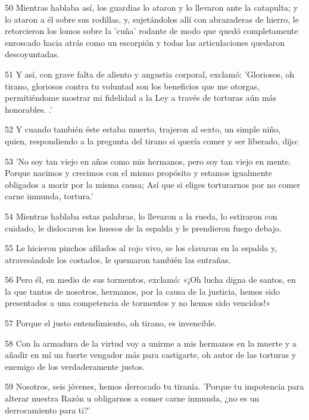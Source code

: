 \par 50 Mientras hablaba así, los guardias lo ataron y lo llevaron ante la catapulta; y lo ataron a él sobre sus rodillas, y, sujetándolos allí con abrazaderas de hierro, le retorcieron los lomos sobre la 'cuña' rodante de modo que quedó completamente enroscado hacia atrás como un escorpión y todas las articulaciones quedaron descoyuntadas.

\par 51 Y así, con grave falta de aliento y angustia corporal, exclamó: 'Gloriosos, oh tirano, gloriosos contra tu voluntad son los beneficios que me otorgas, permitiéndome mostrar mi fidelidad a la Ley a través de torturas aún más honorables. .'

\par 52 Y cuando también éste estaba muerto, trajeron al sexto, un simple niño, quien, respondiendo a la pregunta del tirano si quería comer y ser liberado, dijo:

\par 53 'No soy tan viejo en años como mis hermanos, pero soy tan viejo en mente. Porque nacimos y crecimos con el mismo propósito y estamos igualmente obligados a morir por la misma causa; Así que si eliges torturarnos por no comer carne inmunda, tortura.'

\par 54 Mientras hablaba estas palabras, lo llevaron a la rueda, lo estiraron con cuidado, le dislocaron los huesos de la espalda y le prendieron fuego debajo.

\par 55 Le hicieron pinchos afilados al rojo vivo, se los clavaron en la espalda y, atravesándole los costados, le quemaron también las entrañas.

\par 56 Pero él, en medio de sus tormentos, exclamó: «¡Oh lucha digna de santos, en la que tantos de nosotros, hermanos, por la causa de la justicia, hemos sido presentados a una competencia de tormentos y no hemos sido vencidos!»

\par 57 Porque el justo entendimiento, oh tirano, es invencible.

\par 58 Con la armadura de la virtud voy a unirme a mis hermanos en la muerte y a añadir en mí un fuerte vengador más para castigarte, oh autor de las torturas y enemigo de los verdaderamente justos.

\par 59 Nosotros, seis jóvenes, hemos derrocado tu tiranía. 'Porque tu impotencia para alterar nuestra Razón u obligarnos a comer carne inmunda, ¿no es un derrocamiento para ti?'

